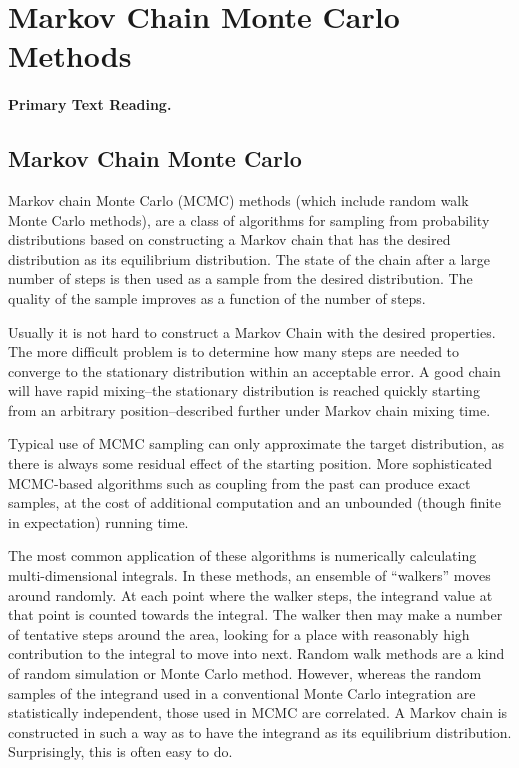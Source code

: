 \section{Markov Chain Monte Carlo Methods}
\paragraph{Primary Text Reading.} 

\subsection{Markov Chain Monte Carlo}
Markov chain Monte Carlo (MCMC) methods (which include random walk Monte Carlo methods), are a class of algorithms for sampling from probability distributions based on constructing a Markov chain that has the desired distribution as its equilibrium distribution. The state of the chain after a large number of steps is then used as a sample from the desired distribution. The quality of the sample improves as a function of the number of steps.

Usually it is not hard to construct a Markov Chain with the desired properties. The more difficult problem is to determine how many steps are needed to converge to the stationary distribution within an acceptable error. A good chain will have rapid mixing--the stationary distribution is reached quickly starting from an arbitrary position--described further under Markov chain mixing time.

Typical use of MCMC sampling can only approximate the target distribution, as there is always some residual effect of the starting position. More sophisticated MCMC-based algorithms such as coupling from the past can produce exact samples, at the cost of additional computation and an unbounded (though finite in expectation) running time.

The most common application of these algorithms is numerically calculating multi-dimensional integrals. In these methods, an ensemble of ``walkers'' moves around randomly. At each point where the walker steps, the integrand value at that point is counted towards the integral. The walker then may make a number of tentative steps around the area, looking for a place with reasonably high contribution to the integral to move into next. Random walk methods are a kind of random simulation or Monte Carlo method. However, whereas the random samples of the integrand used in a conventional Monte Carlo integration are statistically independent, those used in MCMC are correlated. A Markov chain is constructed in such a way as to have the integrand as its equilibrium distribution. Surprisingly, this is often easy to do.

